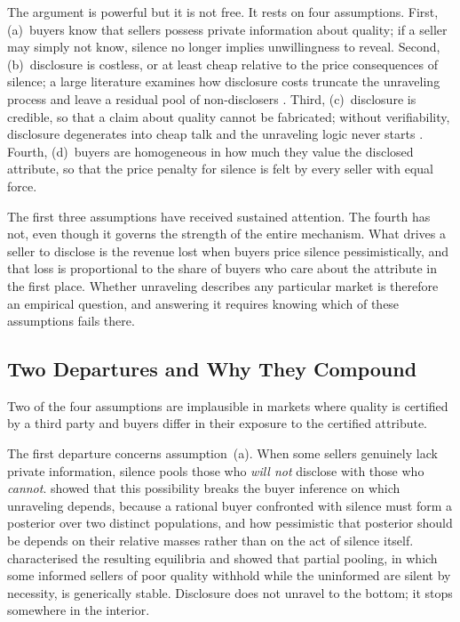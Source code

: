 The argument is powerful but it is not free. It rests on four assumptions. First, (a)~buyers know
that sellers possess private information about quality; if a seller may simply not know, silence
no longer implies unwillingness to reveal. Second, (b)~disclosure is costless, or at least cheap
relative to the price consequences of silence; a large literature examines how disclosure costs
truncate the unraveling process and leave a residual pool of non-disclosers
\citep{verrecchia_1983, jovanovic_1982}. Third, (c)~disclosure is credible, so that a claim about
quality cannot be fabricated; without verifiability, disclosure degenerates into cheap talk and
the unraveling logic never starts \citep{crawford_sobel_1982, stocken_credibility_2000}. Fourth, (d)~buyers are homogeneous in how much they value the
disclosed attribute, so that the price penalty for silence is felt by every seller with equal
force.

The first three assumptions have received sustained attention. The fourth has not, even though
it governs the strength of the entire mechanism. What drives a seller to disclose is the revenue
lost when buyers price silence pessimistically, and that loss is proportional to the share of
buyers who care about the attribute in the first place. Whether unraveling describes any
particular market is therefore an empirical question, and answering it requires knowing which of
these assumptions fails there.

\subsection{Two Departures and Why They Compound}

Two of the four assumptions are implausible in markets where quality is certified by a
third party and buyers differ in their exposure to the certified attribute.

The first departure concerns assumption~(a). When some sellers genuinely lack private
information, silence pools those who \emph{will not} disclose with those who \emph{cannot}.
\citet{dye_disclosure_1985} showed that this possibility breaks the buyer inference on which
unraveling depends, because a rational buyer confronted with silence must form a posterior over two
distinct populations, and how pessimistic that posterior should be depends on their relative
masses rather than on the act of silence itself. \citet{jung_kwon_1988} characterised the
resulting equilibria and showed that partial pooling, in which some informed sellers of poor
quality withhold while the uninformed are silent by necessity, is generically stable. Disclosure
does not unravel to the bottom; it stops somewhere in the interior.

